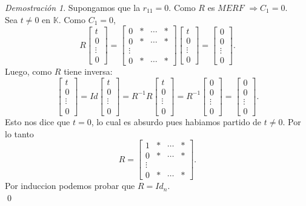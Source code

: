 \documentclass{article}
\theoremstyle{definition}
\theoremstyle{definition}
\theoremstyle{remark}
\newtheorem*{demo}{Demostración}
\begin{document}
\begin{demo}
  Supongamos que la $r_{11}=0$. Como $R$ es $MERF$ $\Rightarrow C_1 = 0$. \\ Sea $t \neq 0$ en $\mathbb{K}$. Como $C_1=0$,\[
    R\begin{bmatrix}t \\ 0 \\ \vdots \\ 0 \end{bmatrix} = \begin{bmatrix} 0 & * & \cdots & * \\ 
    0 & * & \cdots & * \\ 
    \vdots \\
    0 & * & \cdots & * \end{bmatrix} \begin{bmatrix} t \\ 0 \\ \vdots \\ 0 \end{bmatrix} = \begin{bmatrix}0 \\ 0 \\ \vdots \\ 0 \end{bmatrix}.
  \]
  Luego, como $R$ tiene inversa: 
  \[
    \begin{bmatrix} t \\ 0 \\ \vdots \\ 0 \end{bmatrix} = Id\begin{bmatrix} t \\ 0 \\ \vdots \\ 0 \end{bmatrix} =R^{-1}R\begin{bmatrix}t \\ 0 \\ \vdots \\ 0 \end{bmatrix} = R^{-1} \begin{bmatrix}0 \\ 0 \\ \vdots \\0 \end{bmatrix} = \begin{bmatrix} 0 \\ 0 \\ \vdots \\ 0 \end{bmatrix}. 
  \]
  Esto nos dice que $t=0$, lo cual es absurdo pues habiamos partido de $t \neq 0$. Por lo tanto \[
R= \begin{bmatrix} 1 & * & \cdots & * \\ 
    0 & * & \cdots & * \\ 
    \vdots \\
    0 & * & \cdots & * \end{bmatrix}.  \]
    Por induccion podemos probar que $R=Id_n$. \\ \qed
\end{demo}
\pagebreak
\end{document}

